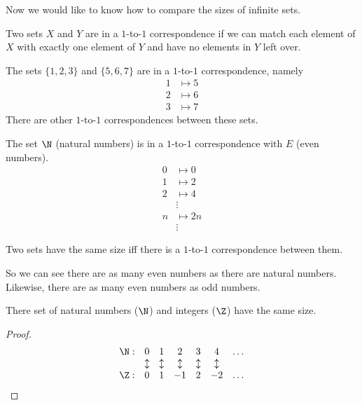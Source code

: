 \documentclass{scrbook}
\begin{document}
Now we would like to know how to compare the sizes of infinite sets. 
\begin{defn}
  Two sets $X$ and $Y$ are in a $1$-to-$1$ correspondence if we can match each element of $X$ with exactly one element of $Y$ and have no elements in $Y$ left over. 
\end{defn}
\begin{example}
  The sets $\{1,2,3\}$ and $\{5,6,7\}$ are in a $1$-to-$1$ correspondence, namely 
  \begin{align*}
    1 &\mapsto 5 \\
    2 &\mapsto 6 \\
    3&\mapsto 7
  \end{align*}
  There are other $1$-to-$1$ correspondences between these sets.  
\end{example}
\begin{example}
  The set $\N$ (natural numbers) is in a $1$-to-$1$ correspondence with $E$ (even numbers). 
  \begin{align*}
    0 &\mapsto 0 \\
    1 &\mapsto 2 \\
    2 &\mapsto 4 \\
    &\vdots \\ 
    n & \mapsto 2n \\
    &\vdots 
  \end{align*}
\end{example}
\begin{defn}[size]
  Two sets have the same size iff there is a $1$-to-$1$ correspondence between them. 
\end{defn}
So we can see there are as many even numbers as there are natural numbers. Likewise, there are as many even numbers as odd numbers. 
\begin{theorem}
  There set of natural numbers ($\N$) and integers ($\Z$) have the same size. 
\end{theorem}
\begin{proof}
  \[
  \begin{matrix}
    \N:& 0 & 1 & 2 & 3 & 4 & \dots \\
       & \updownarrow & \updownarrow& \updownarrow&\updownarrow&\updownarrow& \\
    \Z:& 0 & 1 & -1 & 2 & -2 & \dots 
  \end{matrix}
  \]
\end{proof}
\end{document}

